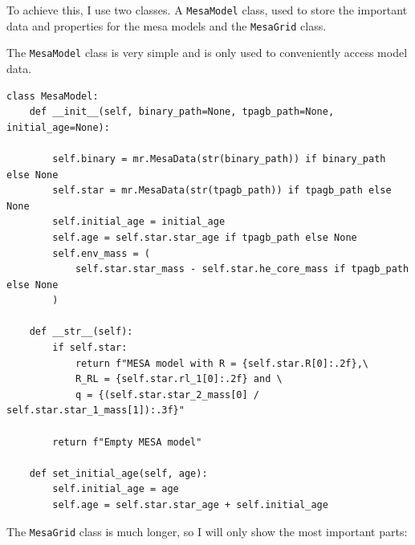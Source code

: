 \documentclass[a4paper,10pt]{article}
\begin{document}
To achieve this, I use two classes. A \lstinline[style=output, breaklines=true]|MesaModel| class, used to store the important data and properties for the mesa models and the \lstinline[style=output, breaklines=true]|MesaGrid| class.

The \lstinline[style=output, breaklines=true]|MesaModel| class is very simple and is only used to conveniently access model data.
\begin{verbatim}
class MesaModel:
    def __init__(self, binary_path=None, tpagb_path=None, initial_age=None):

        self.binary = mr.MesaData(str(binary_path)) if binary_path else None
        self.star = mr.MesaData(str(tpagb_path)) if tpagb_path else None
        self.initial_age = initial_age
        self.age = self.star.star_age if tpagb_path else None
        self.env_mass = (
            self.star.star_mass - self.star.he_core_mass if tpagb_path else None
        )

    def __str__(self):
        if self.star:
            return f"MESA model with R = {self.star.R[0]:.2f},\
            R_RL = {self.star.rl_1[0]:.2f} and \
            q = {(self.star.star_2_mass[0] / self.star.star_1_mass[1]):.3f}"

        return f"Empty MESA model"

    def set_initial_age(self, age):
        self.initial_age = age
        self.age = self.star.star_age + self.initial_age

\end{verbatim}

The \lstinline[style=output, breaklines=true]|MesaGrid| class is much longer, so I will only show the most important parts:
\end{document}
